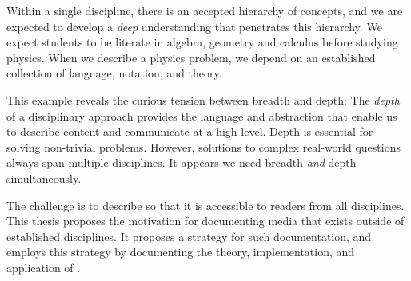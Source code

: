 Within a single discipline, there is an accepted hierarchy of concepts,
and we are expected to develop a \emph{deep} understanding that
penetrates this hierarchy. We expect students to be literate in
algebra, geometry and calculus before studying physics. When we
describe a physics problem, we depend on an established collection of
language, notation, and theory.

This example reveals the curious tension between breadth and depth:
The \textit{depth} of a disciplinary approach provides the language
and abstraction that enable us to describe content and communicate at
a high level. Depth is essential for solving non-trivial
problems. However, solutions to complex real-world questions always
span multiple disciplines. It appears we need breadth \emph{and}
depth simultaneously.

The challenge is to describe \thesis so that it is accessible to
readers from all disciplines. This thesis proposes the motivation for
documenting media that exists outside of established disciplines. It
proposes a strategy for such documentation, and employs this strategy
by documenting the theory, implementation, and application of \thesis.

